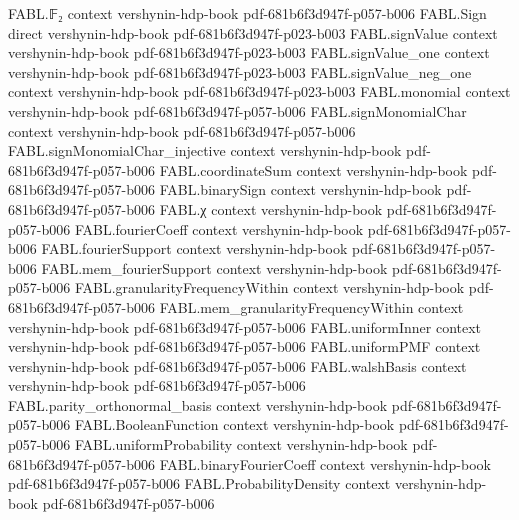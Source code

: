 \begin{theorem}
\proofstep
  {FABL.𝔽₂}
  {context}
  {vershynin-hdp-book}
  {pdf-681b6f3d947f-p057-b006}
\proofstep
  {FABL.Sign}
  {direct}
  {vershynin-hdp-book}
  {pdf-681b6f3d947f-p023-b003}
\proofstep
  {FABL.signValue}
  {context}
  {vershynin-hdp-book}
  {pdf-681b6f3d947f-p023-b003}
\proofstep
  {FABL.signValue_one}
  {context}
  {vershynin-hdp-book}
  {pdf-681b6f3d947f-p023-b003}
\proofstep
  {FABL.signValue_neg_one}
  {context}
  {vershynin-hdp-book}
  {pdf-681b6f3d947f-p023-b003}
\proofstep
  {FABL.monomial}
  {context}
  {vershynin-hdp-book}
  {pdf-681b6f3d947f-p057-b006}
\proofstep
  {FABL.signMonomialChar}
  {context}
  {vershynin-hdp-book}
  {pdf-681b6f3d947f-p057-b006}
\proofstep
  {FABL.signMonomialChar_injective}
  {context}
  {vershynin-hdp-book}
  {pdf-681b6f3d947f-p057-b006}
\proofstep
  {FABL.coordinateSum}
  {context}
  {vershynin-hdp-book}
  {pdf-681b6f3d947f-p057-b006}
\proofstep
  {FABL.binarySign}
  {context}
  {vershynin-hdp-book}
  {pdf-681b6f3d947f-p057-b006}
\proofstep
  {FABL.χ}
  {context}
  {vershynin-hdp-book}
  {pdf-681b6f3d947f-p057-b006}
\proofstep
  {FABL.fourierCoeff}
  {context}
  {vershynin-hdp-book}
  {pdf-681b6f3d947f-p057-b006}
\proofstep
  {FABL.fourierSupport}
  {context}
  {vershynin-hdp-book}
  {pdf-681b6f3d947f-p057-b006}
\proofstep
  {FABL.mem_fourierSupport}
  {context}
  {vershynin-hdp-book}
  {pdf-681b6f3d947f-p057-b006}
\proofstep
  {FABL.granularityFrequencyWithin}
  {context}
  {vershynin-hdp-book}
  {pdf-681b6f3d947f-p057-b006}
\proofstep
  {FABL.mem_granularityFrequencyWithin}
  {context}
  {vershynin-hdp-book}
  {pdf-681b6f3d947f-p057-b006}
\proofstep
  {FABL.uniformInner}
  {context}
  {vershynin-hdp-book}
  {pdf-681b6f3d947f-p057-b006}
\proofstep
  {FABL.uniformPMF}
  {context}
  {vershynin-hdp-book}
  {pdf-681b6f3d947f-p057-b006}
\proofstep
  {FABL.walshBasis}
  {context}
  {vershynin-hdp-book}
  {pdf-681b6f3d947f-p057-b006}
\proofstep
  {FABL.parity_orthonormal_basis}
  {context}
  {vershynin-hdp-book}
  {pdf-681b6f3d947f-p057-b006}
\proofstep
  {FABL.BooleanFunction}
  {context}
  {vershynin-hdp-book}
  {pdf-681b6f3d947f-p057-b006}
\proofstep
  {FABL.uniformProbability}
  {context}
  {vershynin-hdp-book}
  {pdf-681b6f3d947f-p057-b006}
\proofstep
  {FABL.binaryFourierCoeff}
  {context}
  {vershynin-hdp-book}
  {pdf-681b6f3d947f-p057-b006}
\proofstep
  {FABL.ProbabilityDensity}
  {context}
  {vershynin-hdp-book}
  {pdf-681b6f3d947f-p057-b006}

\end{theorem}

